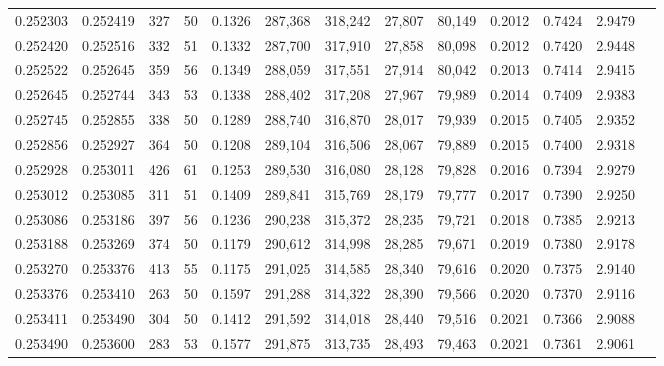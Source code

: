 \begin{tabular}{rrrrrrrrrrrrr}
0.252303 & 0.252419 &   327 &  50 &                                     0.1326 & 287,368 & 318,242 &  27,807 &  80,149 & 0.2012 & 0.7424 & 2.9479 \\
0.252420 & 0.252516 &   332 &  51 &                                     0.1332 & 287,700 & 317,910 &  27,858 &  80,098 & 0.2012 & 0.7420 & 2.9448 \\
0.252522 & 0.252645 &   359 &  56 &                                     0.1349 & 288,059 & 317,551 &  27,914 &  80,042 & 0.2013 & 0.7414 & 2.9415 \\
0.252645 & 0.252744 &   343 &  53 &                                     0.1338 & 288,402 & 317,208 &  27,967 &  79,989 & 0.2014 & 0.7409 & 2.9383 \\
0.252745 & 0.252855 &   338 &  50 &                                     0.1289 & 288,740 & 316,870 &  28,017 &  79,939 & 0.2015 & 0.7405 & 2.9352 \\
0.252856 & 0.252927 &   364 &  50 &                                     0.1208 & 289,104 & 316,506 &  28,067 &  79,889 & 0.2015 & 0.7400 & 2.9318 \\
0.252928 & 0.253011 &   426 &  61 &                                     0.1253 & 289,530 & 316,080 &  28,128 &  79,828 & 0.2016 & 0.7394 & 2.9279 \\
0.253012 & 0.253085 &   311 &  51 &                                     0.1409 & 289,841 & 315,769 &  28,179 &  79,777 & 0.2017 & 0.7390 & 2.9250 \\
0.253086 & 0.253186 &   397 &  56 &                                     0.1236 & 290,238 & 315,372 &  28,235 &  79,721 & 0.2018 & 0.7385 & 2.9213 \\
0.253188 & 0.253269 &   374 &  50 &                                     0.1179 & 290,612 & 314,998 &  28,285 &  79,671 & 0.2019 & 0.7380 & 2.9178 \\
0.253270 & 0.253376 &   413 &  55 &                                     0.1175 & 291,025 & 314,585 &  28,340 &  79,616 & 0.2020 & 0.7375 & 2.9140 \\
0.253376 & 0.253410 &   263 &  50 &                                     0.1597 & 291,288 & 314,322 &  28,390 &  79,566 & 0.2020 & 0.7370 & 2.9116 \\
0.253411 & 0.253490 &   304 &  50 &                                     0.1412 & 291,592 & 314,018 &  28,440 &  79,516 & 0.2021 & 0.7366 & 2.9088 \\
0.253490 & 0.253600 &   283 &  53 &                                     0.1577 & 291,875 & 313,735 &  28,493 &  79,463 & 0.2021 & 0.7361 & 2.9061 \\

\end{tabular}
